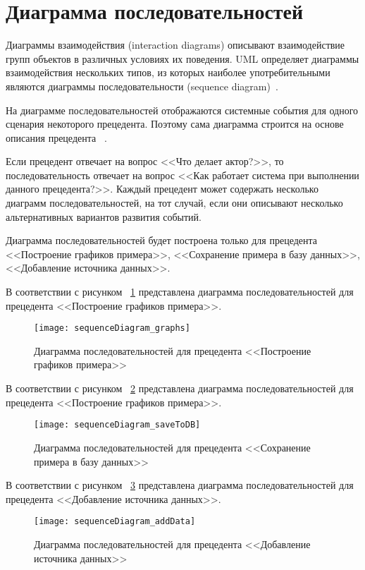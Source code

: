 \documentclass[14pt]{extreport}
\begin{document}
\section{Диаграмма последовательностей}
Диаграммы взаимодействия (interaction diagrams) описывают взаимодействие групп объектов в различных условиях их поведения. UML определяет диаграммы взаимодействия нескольких типов, из которых наиболее употребительными являются диаграммы последовательности (sequence diagram)~\cite{umlDistilled}.

На диаграмме последовательностей отображаются системные события для одного
сценария некоторого прецедента. Поэтому сама диаграмма строится на основе описания
прецедента ~\cite{umlApplying}. 

Если прецедент отвечает на вопрос <<Что делает актор?>>, то последовательность отвечает на вопрос <<Как работает система при выполнении данного прецедента?>>.
Каждый прецедент может содержать несколько диаграмм последовательностей, на тот случай, если они описывают несколько альтернативных вариантов развития событий.

Диаграмма последовательностей будет построена только для прецедента <<Построение графиков примера>>, <<Сохранение примера в базу данных>>, <<Добавление источника 
данных>>.

В соответствии с рисунком ~\ref{fig9} представлена диаграмма последовательностей для прецедента <<Построение графиков примера>>.

\begin{figure}[H]
\centerline{\texttt{[image: sequenceDiagram\_graphs]}}
\caption{Диаграмма последовательностей для прецедента <<Построение графиков примера>>}
\label{fig9}
\end{figure}

В соответствии с рисунком ~\ref{fig10} представлена диаграмма последовательностей для прецедента <<Построение графиков примера>>.

\begin{figure}[H]
\centerline{\texttt{[image: sequenceDiagram\_saveToDB]}}
\caption{Диаграмма последовательностей для прецедента <<Сохранение примера в базу данных>>}
\label{fig10}
\end{figure}

В соответствии с рисунком ~\ref{fig11} представлена диаграмма последовательностей для прецедента <<Добавление источника данных>>.

\begin{figure}[H]
\centerline{\texttt{[image: sequenceDiagram\_addData]}}
\caption{Диаграмма последовательностей для прецедента <<Добавление источника 
данных>>}
\label{fig11}
\end{figure}
\end{document}
